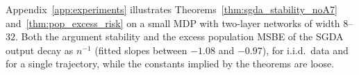 Appendix~\ref{app:experiments} illustrates Theorems~\ref{thm:sgda_stability_noA7}
and~\ref{thm:pop_excess_risk} on a small MDP with two-layer networks of width $8$--$32$. Both the argument
stability and the excess population MSBE of the SGDA output decay as $n^{-1}$ (fitted slopes between
$-1.08$ and $-0.97$), for i.i.d.\ data and for a single trajectory, while the
constants implied by the theorems are loose.
